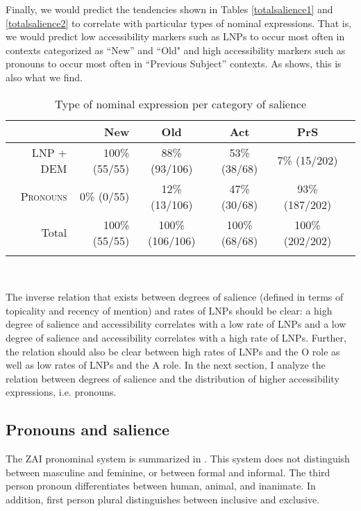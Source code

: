 Finally, we would predict the tendencies shown in Tables \ref{totalsalience1} and \ref{totalsalience2} to correlate with particular types of nominal expressions. That is, we would predict low accessibility markers such as LNPs to occur most often in contexts categorized as ``New'' and ``Old" and high accessibility markers such as pronouns to occur most often in ``Previous Subject'' contexts. As  shows, this is also what we find.
\begin{table}

\caption{{Type of nominal expression per category of salience}}
\begin{tabular}{ r  r  c  c  c  c }
\lsptoprule
 & New & Old & Act & PrS \\

\midrule
\textsc{LNP + DEM} &  100{\%} (55/55) &  88{\%} (93/106) & 53{\%} (38/68) & 7{\%} (15/202) \\

 
\textsc{Pronouns} & 0{\%} (0/55) & 12{\%} (13/106) & 47{\%} (30/68) & 93{\%} (187/202) \\

\midrule 
Total& 100{\%} (55/55) & 100{\%} (106/106) & 100{\%} (68/68) &100{\%} (202/202) \\

\lspbottomrule
\end{tabular}\\
\label{saliencetype}

\end{table}

The inverse relation that exists between degrees of salience (defined in terms of topicality and recency of mention) and rates of LNPs should be clear: a high degree of salience and accessibility correlates with a low rate of LNPs and a low degree of salience and accessibility correlates with a high rate of LNPs. Further, the relation should also be clear between high rates of LNPs and the O role as well as low rates of LNPs and the A role. In the next section, I analyze the relation between degrees of salience and the distribution of higher accessibility expressions, i.e. pronouns. 



\subsection{Pronouns and salience}\label{izpronouns}

The ZAI pronominal system is summarized in . This system does not distinguish between masculine and feminine, or between formal and informal. The third person pronoun differentiates between human, animal, and inanimate. In addition, first person plural distinguishes between inclusive and exclusive.

